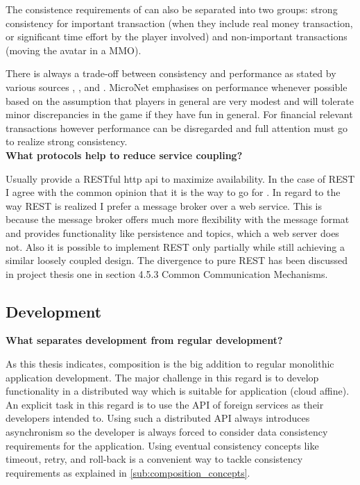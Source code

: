 The consistence requirements of \ogs{} can also be separated into two groups:
strong consistency for important transaction (when they include real money
transaction, or significant time effort by the player involved) and
non-important transactions (moving the avatar in a MMO).

There is always a trade-off between consistency and performance as stated by
various sources \cite{wada2011data}, \cite{olston2000offering}, and
\cite{franklin1997transactional}. MicroNet emphasises on performance whenever
possible based on the assumption that players in general are very modest and
will tolerate minor discrepancies in the game if they have fun in general. For
financial relevant transactions however performance can be disregarded and full
attention must go to realize strong consistency.\\

\noindent
\textbf{What protocols help to reduce service coupling?}

Usually \mss{} provide a RESTful \gls{http} \gls{api} to maximize availability.
In the case of REST I agree with the common opinion that it is the way to go for
\mss{}. In regard to the way REST is realized I prefer a message broker over a
web service. This is because the message broker offers much more flexibility with
the message format and provides functionality like persistence and topics, which
a web server does not. Also it is possible to implement REST only partially
while still achieving a similar loosely coupled design. The divergence to pure
REST has been discussed in project thesis one \cite{biedermann2015project1} in
section 4.5.3 Common Communication Mechanisms.\\

\subsection{\ms{} Development}

\noindent
\textbf{What separates \ms{} development from regular development?}

As this thesis indicates, \ms{} composition is the big addition to regular
monolithic application development. The major challenge in this regard is to
develop functionality in a distributed way which is suitable for \ms{}
application (cloud affine). An explicit task in this regard is to use the API of
foreign services as their developers intended to. Using such a distributed
API always introduces asynchronism so the developer is always forced to consider
data consistency requirements for the application. Using eventual consistency
concepts like timeout, retry, and roll-back is a convenient way to tackle 
consistency requirements as explained in \autoref{sub:composition_concepts}.

